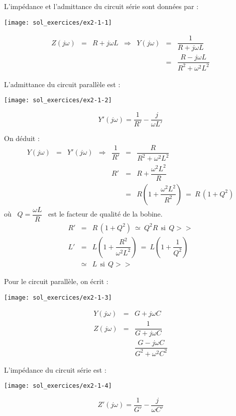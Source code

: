 L'impédance et l'admittance  du circuit série sont  données par :

\parbox[c]{2cm}{
	\hfill
	\texttt{[image: sol\_exercices/ex2-1-1]}}
\parbox[c]{7cm}{
	\[ \begin{array}{rclcrcl}
	Z(j\omega ) &=& R + j\omega L 
	& \Rightarrow & Y(j\omega ) &=& \dfrac{1}{R+j\omega L} \\
	&&&&&=& \dfrac{R-j\omega L}{R^2+\omega^2 L^2}
	\end{array}\]}

L'admittance du circuit parallèle est :

\parbox[c]{2cm}{
	\hfill
	\texttt{[image: sol\_exercices/ex2-1-2]}
	}
\parbox[c]{7cm}{
	\[Y'(j\omega ) = \dfrac{1}{R'} - \dfrac{j}{\omega L'}\]}

On déduit :
\[\begin{array}{rclcrcl}
Y(j\omega ) &=& Y'(j\omega ) 
& \Rightarrow & \dfrac{1}{R'} &=& \dfrac{R}{R^2+\omega^2 L^2}\\
&&&& R'&=& R + \dfrac{\omega^2 L^2}{R}\\
&&&&&=& R \left( 1 + \dfrac{\omega^2 L^2}{R^2} \right) \: = \: R\, (1+Q^2)
\end{array} 
\]
où \ $Q = \dfrac{\omega L}{R}$ \ est le facteur de qualité de la bobine.
\begin{eqnarray*}
	R' &=&  R\, (1+Q^2) \: \simeq \: Q^2 R ~~\mbox{si}~~Q >>\\
	L' &=& L \left( 1 + \dfrac{R^2}{\omega^2 L^2} \right) \: = \: L \left( 1 + \dfrac{1}{Q^2} \right)\\
	&\simeq&  L ~~\mbox{si}~~Q >>~
\end{eqnarray*}


Pour le circuit parallèle, on écrit :

\parbox[c]{2cm}{
	\hfill
	\texttt{[image: sol\_exercices/ex2-1-3]}
}
\parbox[c]{7cm}{
	\begin{eqnarray*}
		Y(j\omega ) &=& G + j\omega C\\
		Z(j\omega ) &=& \dfrac{1}{G + j\omega C}\\
		&& \dfrac{G - j\omega C}{G^2 + \omega^2 C^2}
\end{eqnarray*}}

L'impédance du circuit série est :

\parbox[c]{2cm}{
	\hfill
	\texttt{[image: sol\_exercices/ex2-1-4]}
}
\parbox[c]{7cm}{
	\[Z'(j\omega ) = \dfrac{1}{G'} - \dfrac{j}{\omega C'}\]}


